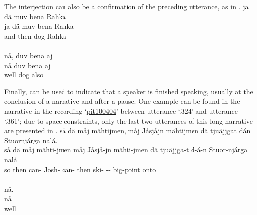 
The interjection  can also be a confirmation of the preceding utterance, as in .
\ea\label{particleEx4}
\glll	{} ja dä muv bena Rahka\\
	{} ja dä muv bena Rahka\\
	{} and then  dog\BS{} Rahka\\\nopagebreak
{}\\
\glll	{} nå, duv bena aj\\
	{} nå duv bena aj\\
	{} well  dog\BS{} also\\\nopagebreak
{}	
\z

Finally,  can be used to indicate that a speaker is finished speaking, usually at the conclusion of a narrative and after a pause. One example can be found in the narrative in the recording ‘\hyperlink{pit100404}{pit100404}’ between utterance ‘.324’ and utterance ‘.361’; due to space constraints, only the last two utterances of this long narrative are presented in . %
\ea\label{noEx1}
\glll	{} så dä måj mähtijmen, måj Jåsjåjn mähtijmen {\hspace{14pt}dä} tjuäjjgat dán Stuornjárga nalá.\\
	{} så dä måj mähti-jmen måj Jåsjå-jn mähti-jmen {\hspace{14pt}dä} tjuäjjga-t d-á-n Stuor-njárga nalá\\
	{} so then  can-  Josh- can- {\hspace{14pt}then} ski- -- big-point\BS{} onto\\\nopagebreak
{}\\	%
\glll	{} nå.\\
	{} nå\\
	{} well\\\nopagebreak
{}	
\z


